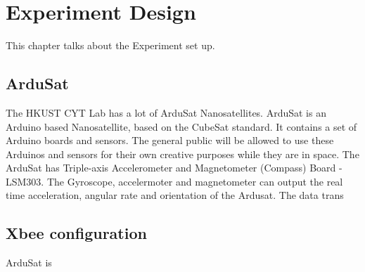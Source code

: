 \chapter{Experiment Design}\label{sec-DOE}
This chapter talks about the Experiment set up.
\section{ArduSat}
The HKUST CYT Lab has a lot of ArduSat Nanosatellites. ArduSat is an Arduino based Nanosatellite, based on the CubeSat standard. It contains a set of Arduino boards and sensors. The general public will be allowed to use these Arduinos and sensors for their own creative purposes while they are in space. 
The ArduSat has Triple-axis Accelerometer and Magnetometer (Compass) Board - LSM303. The Gyroscope, accelermoter and magnetometer can output the real time acceleration, angular rate and orientation of the Ardusat. The data trans
\section{Xbee configuration}

ArduSat is 